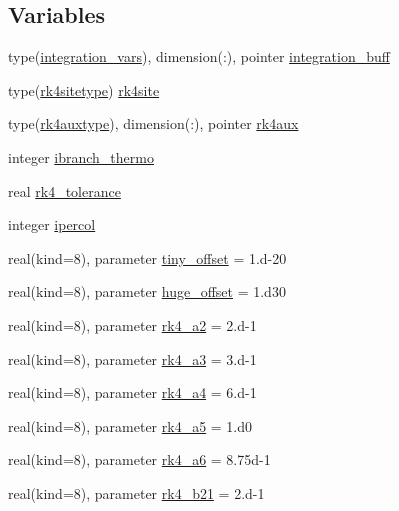 \subsection*{Variables}
\begin{DoxyCompactItemize}
\item 
type(\hyperlink{structrk4__coms_1_1integration__vars}{integration\+\_\+vars}), dimension(\+:), pointer \hyperlink{namespacerk4__coms_a3c62cf3b7294822d789a72c33ed42538}{integration\+\_\+buff}
\item 
type(\hyperlink{structrk4__coms_1_1rk4sitetype}{rk4sitetype}) \hyperlink{namespacerk4__coms_a3b1e8e5ff59d681b92bc9f477f91a111}{rk4site}
\item 
type(\hyperlink{structrk4__coms_1_1rk4auxtype}{rk4auxtype}), dimension(\+:), pointer \hyperlink{namespacerk4__coms_af06182f853d5a71c46e249e55fe5a678}{rk4aux}
\item 
integer \hyperlink{namespacerk4__coms_a33cf51cec0937e19a61030894187ddbc}{ibranch\+\_\+thermo}
\item 
real \hyperlink{namespacerk4__coms_ab839ff31cd3abc7dd1fd40e4d3983a31}{rk4\+\_\+tolerance}
\item 
integer \hyperlink{namespacerk4__coms_a49c5428026d0aece9bcf4f9a87c7b823}{ipercol}
\item 
real(kind=8), parameter \hyperlink{namespacerk4__coms_a3d0ca14edbf0ca895d40d7a9c49e75da}{tiny\+\_\+offset} = 1.d-\/20
\item 
real(kind=8), parameter \hyperlink{namespacerk4__coms_a09bb1518d1ed93891ef24fa73feb7cbe}{huge\+\_\+offset} = 1.d30
\item 
real(kind=8), parameter \hyperlink{namespacerk4__coms_aaccaa3d4ec955eecd38ce2c8c8813cf9}{rk4\+\_\+a2} = 2.d-\/1
\item 
real(kind=8), parameter \hyperlink{namespacerk4__coms_aaa2167ee06ad594c46793e7280b248f7}{rk4\+\_\+a3} = 3.d-\/1
\item 
real(kind=8), parameter \hyperlink{namespacerk4__coms_aaa712c298024351472a4f80d5020e7fc}{rk4\+\_\+a4} = 6.d-\/1
\item 
real(kind=8), parameter \hyperlink{namespacerk4__coms_ac364eca74fa5b87b0821f6e547e30368}{rk4\+\_\+a5} = 1.d0
\item 
real(kind=8), parameter \hyperlink{namespacerk4__coms_a572359022b68f636423b3dde68f9c34a}{rk4\+\_\+a6} = 8.\+75d-\/1
\item 
real(kind=8), parameter \hyperlink{namespacerk4__coms_a34abdb75b43eceb865d986e7874e03d7}{rk4\+\_\+b21} = 2.d-\/1
\item 

\end{DoxyCompactItemize}

